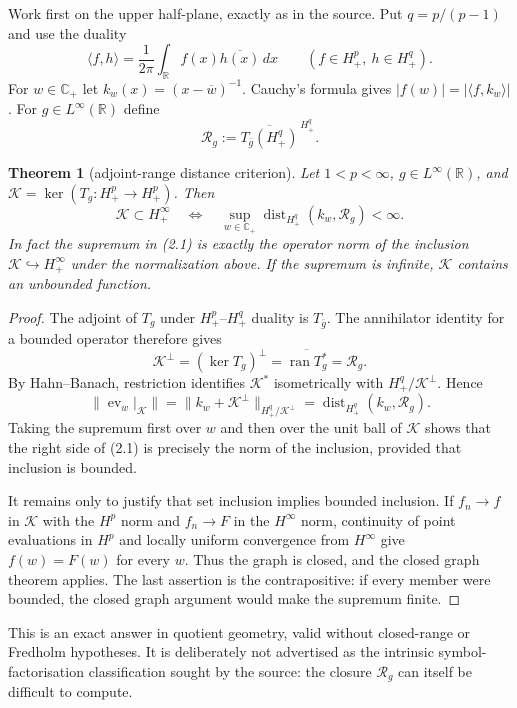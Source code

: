 \documentclass[11pt]{article}
\newtheorem{theorem}{Theorem}
\newcommand{\C}{\mathbb C}
\newcommand{\R}{\mathbb R}
\newcommand{\dist}{\operatorname{dist}}
\begin{document}
Work first on the upper half-plane, exactly as in the source.  Put
$q=p/(p-1)$ and use the duality
\[
 \langle f,h\rangle=\frac1{2\pi}\int_{\R}f(x)\overline{h(x)}\,dx
 \qquad(f\in H^p_+,\ h\in H^q_+).
\]
For $w\in\C_+$ let $k_w(x)=(x-\overline w)^{-1}$.  Cauchy's formula gives
$|f(w)|=|\langle f,k_w\rangle|$.  For $g\in L^\infty(\R)$ define
\[
 \mathcal R_g:=\overline{T_{\overline g}(H^q_+)}^{\,H^q_+}.
\]

\begin{theorem}[adjoint-range distance criterion]\label{thm:distance}
Let $1<p<\infty$, $g\in L^\infty(\R)$, and
$\mathcal K=\ker(T_g:H^p_+\to H^p_+)$.  Then
\[
 \mathcal K\subset H^\infty_+
 \quad\Longleftrightarrow\quad
 \sup_{w\in\C_+}\dist_{H^q_+}(k_w,\mathcal R_g)<\infty.                 \tag{2.1}
\]
In fact the supremum in \textup{(2.1)} is exactly the operator norm of the
inclusion $\mathcal K\hookrightarrow H^\infty_+$ under the normalization
above.  If the supremum is infinite, $\mathcal K$ contains an unbounded
function.
\end{theorem}

\begin{proof}
The adjoint of $T_g$ under $H^p_+$--$H^q_+$ duality is $T_{\overline g}$.
The annihilator identity for a bounded operator therefore gives
\[
 \mathcal K^\perp
   =(\ker T_g)^\perp
   =\overline{\operatorname{ran}T_g^*}
   =\mathcal R_g.
\]
By Hahn--Banach, restriction identifies $\mathcal K^*$ isometrically with
$H^q_+/\mathcal K^\perp$.  Hence
\[
 \|\operatorname{ev}_w|_{\mathcal K}\|
 =\|k_w+\mathcal K^\perp\|_{H^q_+/\mathcal K^\perp}
 =\dist_{H^q_+}(k_w,\mathcal R_g).                                    \tag{2.2}
\]
Taking the supremum first over $w$ and then over the unit ball of $\mathcal K$
shows that the right side of (2.1) is precisely the norm of the inclusion,
provided that inclusion is bounded.

It remains only to justify that set inclusion implies bounded inclusion.  If
$f_n\to f$ in $\mathcal K$ with the $H^p$ norm and $f_n\to F$ in the
$H^\infty$ norm, continuity of point evaluations in $H^p$ and locally uniform
convergence from $H^\infty$ give $f(w)=F(w)$ for every $w$.  Thus the graph is
closed, and the closed graph theorem applies.  The last assertion is the
contrapositive: if every member were bounded, the closed graph argument would
make the supremum finite.
\end{proof}

This is an exact answer in quotient geometry, valid without closed-range or
Fredholm hypotheses.  It is deliberately not advertised as the intrinsic
symbol-factorisation classification sought by the source: the closure
$\mathcal R_g$ can itself be difficult to compute.
\end{document}
